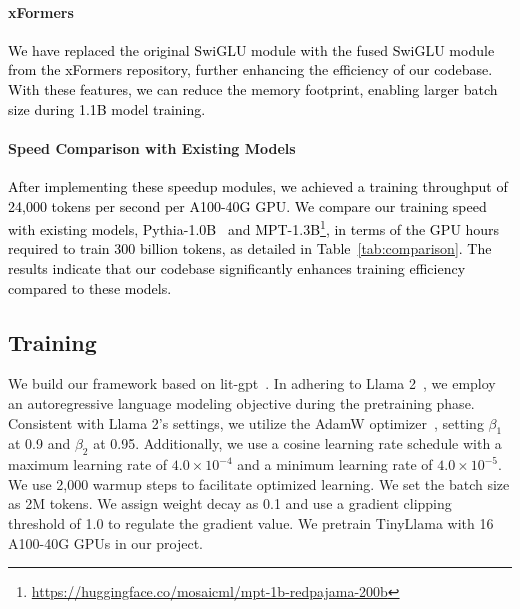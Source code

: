 \documentclass{article}
\begin{document}
\paragraph{xFormers}
\textcolor{black}{
We have replaced the original SwiGLU module with the fused SwiGLU module from the xFormers \citep{xFormers2022} repository, further enhancing the efficiency of our codebase.
With these features, we can reduce the memory footprint, enabling larger batch size during 1.1B model training.
}


\begin{table}
  \vspace{-12pt}
  \centering
  \caption{ 
     Comparison of our training speed with Pythia-1.0B and MPT-1.3B.
  }
  \label{tab:comparison}
  \vspace{-10pt}
\end{table}
\vspace{-1em}
\paragraph{Speed Comparison with Existing Models} 
\textcolor{black}{
%
After implementing these speedup modules,
    we achieved a training throughput of 24,000 tokens per second per A100-40G GPU.
%
We compare our training speed with existing models, 
    Pythia-1.0B~\citep{biderman2023pythia} and MPT-1.3B\footnote{\url{https://huggingface.co/mosaicml/mpt-1b-redpajama-200b}},
    in terms of the GPU hours required to train 300 billion tokens, as detailed in Table~\ref{tab:comparison}.
%
The results indicate that our codebase significantly enhances training efficiency compared to these models.
}

\vspace{-0.5em}
\subsection{Training}
We build our framework based on lit-gpt~\citep{lit-gpt}.
In adhering to Llama 2~\citep{touvron2023llama2}, we employ an autoregressive language modeling objective during the pretraining phase.
Consistent with Llama 2's settings, we utilize the AdamW optimizer~\citep{DBLP:conf/iclr/LoshchilovH19}, setting $\beta_1$ at 0.9 and 
$\beta_2 $ at 0.95.
Additionally, we use a cosine learning rate schedule with a maximum learning rate of $4.0\times 10^{-4} $ and a minimum learning rate of $4.0 \times 10 ^ {-5} $.
We use 2,000 warmup steps to facilitate optimized learning.
We set the batch size as 2M tokens.
We assign weight decay as 0.1 and use a gradient clipping threshold of 1.0 to regulate the gradient value.
We pretrain TinyLlama with 16 A100-40G GPUs in our project.
\end{document}
